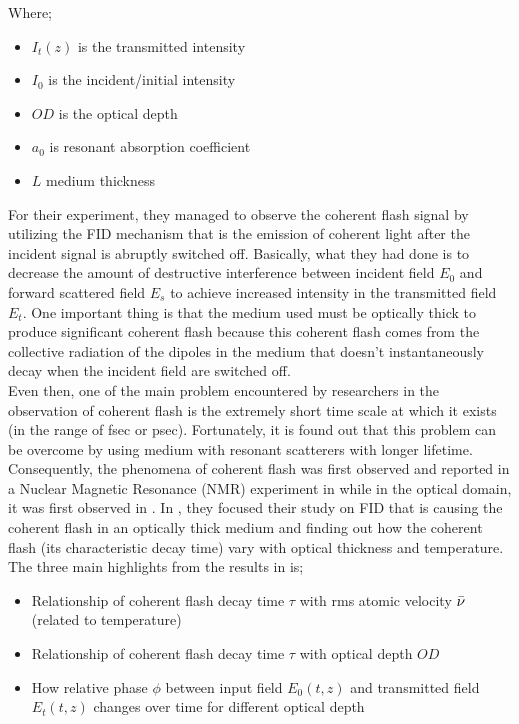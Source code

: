 Where;

\begin{itemize}
    \item $I_{t}(z)$ is the transmitted intensity
    \item $I_{0}$ is the incident/initial intensity
    \item $OD$ is the optical depth
    \item $a_{0}$ is resonant absorption coefficient
    \item $L$ medium thickness
\end{itemize}

For their experiment, they managed to observe the coherent flash signal by utilizing the FID mechanism that is the emission of coherent light after the incident signal is abruptly switched off. Basically, what they had done is to decrease the amount of destructive interference between incident field $E_0$ and forward scattered field $E_s$ to achieve increased intensity in the transmitted field $E_t$. One important thing is that the medium used must be optically thick to produce significant coherent flash because this coherent flash comes from the collective radiation of the dipoles in the medium that doesn't instantaneously decay when the incident field are switched off.\\

Even then, one of the main problem encountered by researchers in the observation of coherent flash is the extremely short time scale at which it exists (in the range of fsec or psec). Fortunately, it is found out that this problem can be overcome by using medium with resonant scatterers with longer lifetime. Consequently, the phenomena of coherent flash was first observed and reported in a Nuclear Magnetic Resonance (NMR) experiment in \cite{Hahn1950} while in the optical domain, it was first observed in \cite{Brewer1972, Foster1974}. In \cite{Chalony2011}, they focused their study on FID that is causing the coherent flash in an optically thick medium and finding out how the coherent flash (its characteristic decay time) vary with optical thickness and temperature. The three main highlights from the results in \cite{Chalony2011} is;

\begin{itemize}
    \item Relationship of coherent flash decay time $\tau$ with rms atomic velocity $\Bar{\nu}$ (related to temperature)
    \item Relationship of coherent flash decay time $\tau$ with optical depth $OD$
    \item How relative phase $\phi$ between input field $E_{0}(t, z)$ and transmitted field $E_{t}(t, z)$ changes over time for different optical depth
\end{itemize}

